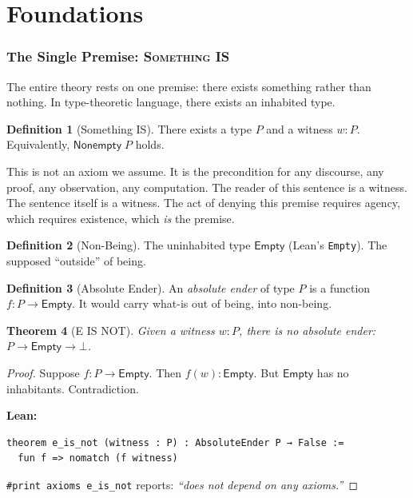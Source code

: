\documentclass[11pt,a4paper]{article}
\newtheorem{theorem}{Theorem}[section]
\theoremstyle{definition}
\newtheorem{definition}[theorem]{Definition}
\theoremstyle{remark}
\newcommand{\SomethingIS}{\textsc{Something IS}}
\newcommand{\AbsEnder}[1]{#1 \to \mathsf{Empty}}
\newcommand{\NonBeing}{\mathsf{Empty}}
\newcommand{\Something}[1]{\mathsf{Nonempty}\;#1}
\begin{document}
\newpage
\tableofcontents
\newpage

\part{Foundations}

\section{The Single Premise: \SomethingIS}
\label{sec:something-is}

The entire theory rests on one premise: there exists something rather than nothing. In type-theoretic language, there exists an inhabited type.

\begin{definition}[Something IS]
\label{def:something-is}
There exists a type $P$ and a witness $w : P$. Equivalently, $\Something{P}$ holds.
\end{definition}

This is not an axiom we assume. It is the precondition for any discourse, any proof, any observation, any computation. The reader of this sentence is a witness. The sentence itself is a witness. The act of denying this premise requires agency, which requires existence, which \emph{is} the premise.

\begin{definition}[Non-Being]
The uninhabited type $\NonBeing$ (Lean's \texttt{Empty}). The supposed ``outside'' of being.
\end{definition}

\begin{definition}[Absolute Ender]
An \emph{absolute ender} of type $P$ is a function $f : \AbsEnder{P}$. It would carry what-is out of being, into non-being.
\end{definition}

\begin{theorem}[E IS NOT]
\label{thm:e-is-not}
Given a witness $w : P$, there is no absolute ender: $\AbsEnder{P} \to \bot$.
\end{theorem}
\begin{proof}
Suppose $f : \AbsEnder{P}$. Then $f(w) : \NonBeing$. But $\NonBeing$ has no inhabitants. Contradiction.

\noindent\textbf{Lean:}
\begin{lstlisting}
theorem e_is_not (witness : P) : AbsoluteEnder P → False :=
  fun f => nomatch (f witness)
\end{lstlisting}
\texttt{\#print axioms e\_is\_not} reports: \emph{``does not depend on any axioms.''}
\end{proof}
\end{document}
